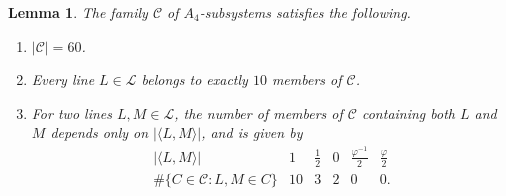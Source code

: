 \documentclass[10pt,a4paper]{amsart}
\newtheorem{lemma}{Lemma}
\begin{document}
\begin{lemma}\label{lem:app-H4-A4-incidences}
The family \(\mathcal C\) of \(A_{4}\)-subsystems satisfies the following.
\begin{enumerate}
    \item[\textup{(i)}] \(|\mathcal C|=60\).
    \item[\textup{(ii)}] Every line \(L\in\mathcal L\) belongs to exactly
    \(10\) members of \(\mathcal C\).
    \item[\textup{(iii)}] For two lines \(L,M\in\mathcal L\), the number
    of members of \(\mathcal C\) containing both \(L\) and \(M\) depends
    only on \(|\langle L,M\rangle|\), and is given by
    \begin{equation}\label{eq:app-H4-A4-pair-table}
    \begin{array}{c|ccccc}
    |\langle L,M\rangle|
    & 1 & \frac{1}{2} & 0 & \frac{\varphi^{-1}}{2} & \frac{\varphi}{2} \\
    \hline
    \#\{C\in\mathcal C:L,M\in C\}
    & 10 & 3 & 2 & 0 & 0 .
    \end{array}
    \end{equation}
\end{enumerate}
\end{lemma}
\end{document}
